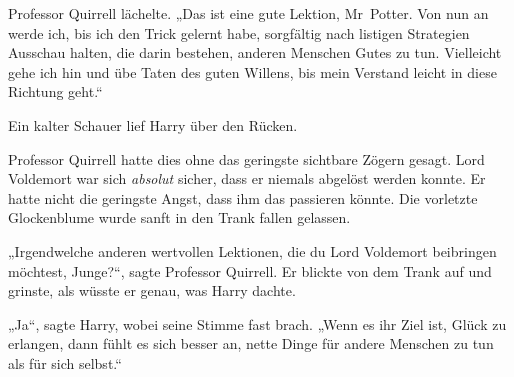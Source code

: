 Professor Quirrell lächelte.
„Das ist eine gute Lektion, Mr~Potter. Von nun an werde ich, bis ich den Trick gelernt habe, sorgfältig nach listigen Strategien Ausschau halten, die darin bestehen, anderen Menschen Gutes zu tun. Vielleicht gehe ich hin und übe Taten des guten Willens, bis mein Verstand leicht in diese Richtung geht.“

Ein kalter Schauer lief Harry über den Rücken.

Professor Quirrell hatte dies ohne das geringste sichtbare Zögern gesagt.
Lord Voldemort war sich \emph{absolut} sicher, dass er niemals abgelöst werden konnte. Er hatte nicht die geringste Angst, dass ihm das passieren könnte.
Die vorletzte Glockenblume wurde sanft in den Trank fallen gelassen.

„Irgendwelche anderen wertvollen Lektionen, die du Lord Voldemort beibringen möchtest, Junge?“, sagte Professor Quirrell. Er blickte von dem Trank auf und grinste, als wüsste er genau, was Harry dachte.

„Ja“, sagte Harry, wobei seine Stimme fast brach.
„Wenn es ihr Ziel ist, Glück zu erlangen, dann fühlt es sich besser an, nette Dinge für andere Menschen zu tun als für sich selbst.“

